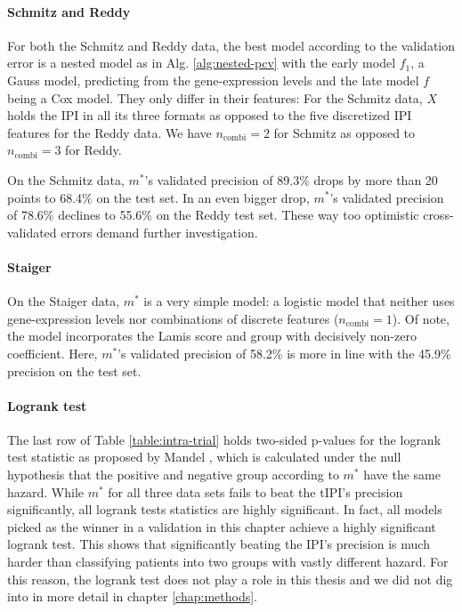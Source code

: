 \paragraph{Schmitz and Reddy}
For both the Schmitz and Reddy data, the best model according to the validation error is a nested 
model as in Alg. \ref{alg:nested-pcv} with the early model $f_1$, a Gauss model, predicting from 
the gene-expression levels and the late model $f$ being a Cox model. They only differ in their 
features: For the Schmitz data, $X$ holds the IPI in all its three formats as opposed to the five 
discretized IPI features for the Reddy data. We have $n_\text{combi} = 2$ for Schmitz as opposed to 
$n_\text{combi} = 3$ for Reddy.

On the Schmitz data, $m^*$'s validated precision of \num{89.3}\% drops by more than \num{20} points 
to \num{68.4}\% on the test set. In an even bigger drop, $m^*$'s validated precision of \num{78.6}\% 
declines to \num{55.6}\% on the Reddy test set. These way too optimistic cross-validated errors 
demand further investigation.

\paragraph{Staiger}
On the Staiger data, $m^*$ is a very simple model: a logistic model that neither uses 
gene-expression levels nor combinations of discrete features ($n_\text{combi} = 1$). Of note, the 
model incorporates the Lamis score and group with decisively non-zero coefficient. Here, $m^*$'s 
validated precision of \num{58.2}\% is more in line with the \num{45.9}\% precision on the test set.

\paragraph{Logrank test}
The last row of Table \ref{table:intra-trial} holds two-sided p-values for the logrank test
statistic as proposed by Mandel \cite{mantel66}, which is calculated under the null hypothesis 
that the positive and negative group according to $m^*$ have the same hazard. While $m^*$ for all 
three data sets fails to beat the tIPI's precision significantly, all logrank tests statistics are 
highly significant. In fact, all models picked as the winner in a validation in this chapter 
achieve a highly significant logrank test. This shows that significantly beating the 
IPI's precision is much harder than classifying patients into two groups with vastly different 
hazard. For this reason, the logrank test does not play a role in this thesis and we did not dig 
into in more detail in chapter \ref{chap:methods}.

